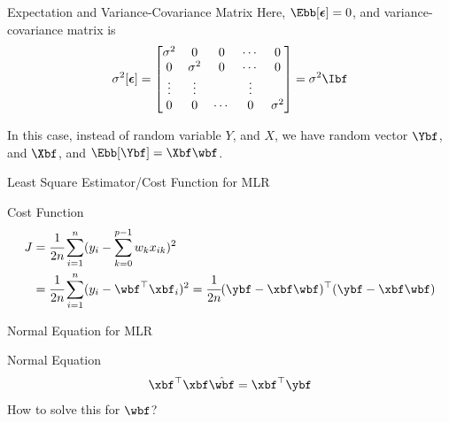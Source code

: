 \documentclass[aspectratio=169,xcolor=dvipsnames,svgnames,x11names,fleqn]{beamer}
\begin{document}
    \begin{frame}[allowframebreaks]{Expectation and Variance-Covariance Matrix}
    Here, $\Ebb[\boldsymbol{\epsilon}] = 0$, and variance-covariance matrix is
    \begin{equation}
        \sigma^2[\boldsymbol{\epsilon}] =  \begin{bmatrix}
            \sigma^2 & 0 & 0 & \cdots & 0\\
            0 & \sigma^2 & 0 & \cdots & 0\\
            \vdots & \vdots & & \vdots \\
            0 & 0 & \cdots & 0 & \sigma^2
        \end{bmatrix} = \sigma^2\Ibf
    \end{equation}
    
    In this case, instead of random variable $Y$, and $X$, we have random vector $\Ybf$, and $\Xbf$, and $\Ebb[\Ybf] = \Xbf \wbf $.
    \end{frame}
    
\begin{frame}{Least Square Estimator/Cost Function for MLR}
    \begin{facts}{Cost Function}
    {
    \LARGE
    \begin{equation}
    \begin{aligned}
        J & = \cfrac{1}{2n}\sum_{i=1}^n ( y_i - \sum_{k=0}^{p-1} w_k x_{ik} )^2\\
        & =  \cfrac{1}{2n}\sum_{i=1}^n ( y_i - \wbf^\top \xbf_i )^2 = \cfrac{1}{2n}(\ybf - \xbf \wbf)^\top(\ybf - \xbf \wbf)
        \end{aligned}
    \end{equation}
    }
    \end{facts}
    \end{frame}
    
\begin{frame}{Normal Equation for MLR}
    \begin{facts}{Normal Equation}
    {
    \Large
    \begin{equation}
       \xbf^\top\xbf \hat{\wbf} = \xbf^\top\ybf
    \end{equation}
    How to solve this for $\wbf$?
    }
    \end{facts}
    \end{frame}
    
\end{document}
